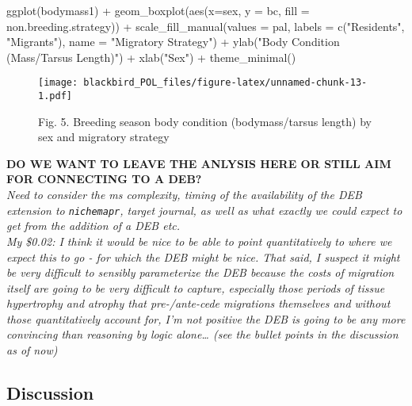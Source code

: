 \documentclass[
]{article}
\newenvironment{Shaded}{\begin{snugshade}}{\end{snugshade}}
\newcommand{\AttributeTok}[1]{\textcolor[rgb]{0.77,0.63,0.00}{#1}}
\newcommand{\FunctionTok}[1]{\textcolor[rgb]{0.00,0.00,0.00}{#1}}
\newcommand{\NormalTok}[1]{#1}
\newcommand{\SpecialCharTok}[1]{\textcolor[rgb]{0.00,0.00,0.00}{#1}}
\newcommand{\StringTok}[1]{\textcolor[rgb]{0.31,0.60,0.02}{#1}}
\begin{document}
\begin{Shaded}
\begin{Highlighting}[]
\FunctionTok{ggplot}\NormalTok{(bodymass1) }\SpecialCharTok{+}
  \FunctionTok{geom\_boxplot}\NormalTok{(}\FunctionTok{aes}\NormalTok{(}\AttributeTok{x=}\NormalTok{sex, }\AttributeTok{y =}\NormalTok{ bc, }\AttributeTok{fill =}\NormalTok{ non.breeding.strategy)) }\SpecialCharTok{+} 
  \FunctionTok{scale\_fill\_manual}\NormalTok{(}\AttributeTok{values =}\NormalTok{ pal, }\AttributeTok{labels =} \FunctionTok{c}\NormalTok{(}\StringTok{"Residents"}\NormalTok{, }\StringTok{"Migrants"}\NormalTok{),}
                     \AttributeTok{name =} \StringTok{"Migratory Strategy"}\NormalTok{) }\SpecialCharTok{+}
  \FunctionTok{ylab}\NormalTok{(}\StringTok{"Body Condition (Mass/Tarsus Length)"}\NormalTok{) }\SpecialCharTok{+}
  \FunctionTok{xlab}\NormalTok{(}\StringTok{"Sex"}\NormalTok{) }\SpecialCharTok{+}
  \FunctionTok{theme\_minimal}\NormalTok{()}
\end{Highlighting}
\end{Shaded}

\begin{figure}
\centering
\texttt{[image: blackbird\_POL\_files/figure-latex/unnamed-chunk-13-1.pdf]}
\caption{Fig. 5. Breeding season body condition (bodymass/tarsus length)
by sex and migratory strategy}
\end{figure}

\textbf{DO WE WANT TO LEAVE THE ANLYSIS HERE OR STILL AIM FOR CONNECTING
TO A DEB?}\\
\emph{Need to consider the ms complexity, timing of the availability of
the DEB extension to \texttt{nichemapr}, target journal, as well as what
exactly we could expect to get from the addition of a DEB etc.}\\
\emph{My \$0.02: I think it would be nice to be able to point
quantitatively to where we expect this to go - for which the DEB might
be nice. That said, I suspect it might be very difficult to sensibly
parameterize the DEB because the costs of migration itself are going to
be very difficult to capture, especially those periods of tissue
hypertrophy and atrophy that pre-/ante-cede migrations themselves and
without those quantitatively account for, I'm not positive the DEB is
going to be any more convincing than reasoning by logic alone\ldots{}
(see the bullet points in the discussion as of now)}

\hypertarget{discussion}{%
\subsection{Discussion}\label{discussion}}
\end{document}

